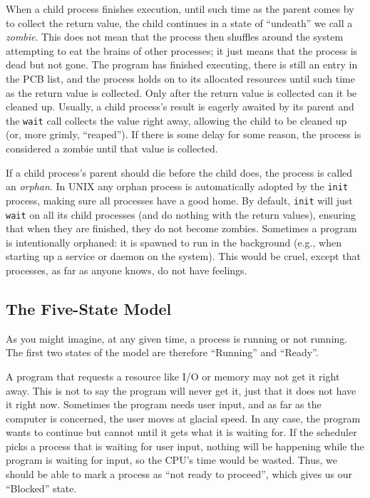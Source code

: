 When a child process finishes execution, until such time as the parent comes by to collect the return value, the child continues in a state of ``undeath'' we call a \textit{zombie}. This does not mean that the process then shuffles around the system attempting to eat the brains of other processes; it just means that the process is dead but not gone. The program has finished executing, there is still an entry in the PCB list, and the process holds on to its allocated resources until such time as the return value is collected. Only after the return value is collected can it be cleaned up. Usually, a child process's result is eagerly awaited by its parent and the \texttt{wait} call collects the value right away, allowing the child to be cleaned up (or, more grimly, ``reaped''). If there is some delay for some reason, the process is considered a zombie until that value is collected.

If a child process's parent should die before the child does, the process is called an \textit{orphan}. In UNIX any orphan process is automatically adopted by the \texttt{init} process, making sure all processes have a good home. By default, \texttt{init} will just \texttt{wait} on all its child processes (and do nothing with the return values), ensuring that when they are finished, they do not become zombies. Sometimes a program is intentionally orphaned: it is spawned to run in the background (e.g., when starting up a service or daemon on the system). This would be cruel, except that processes, as far as anyone knows, do not have feelings.

\subsection*{The Five-State Model}

As you might imagine, at any given time, a process is running or not running. The first two states of the model are therefore ``Running'' and ``Ready''.

A program that requests a resource like I/O or memory may not get it right away. This is not to say the program will never get it, just that it does not have it right now. Sometimes the program needs user input, and as far as the computer is concerned, the user moves at glacial speed. In any case, the program wants to continue but cannot until it gets what it is waiting for.  If the scheduler picks a process that is waiting for user input, nothing will be happening while the program is waiting for input, so the CPU's time would be wasted. Thus, we should be able to mark a process as ``not ready to proceed'', which gives us our ``Blocked'' state.

